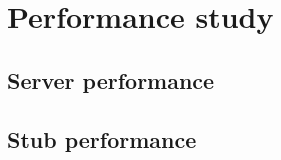 \chapter{Performance study}
    
    \section{Server performance}
    \section{Stub performance} 
     
